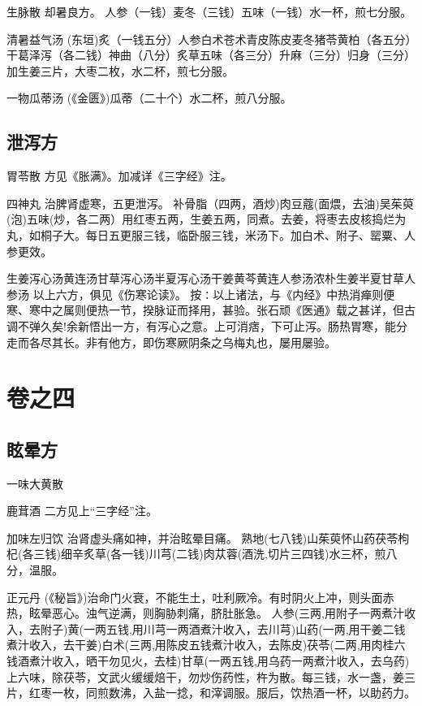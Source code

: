 \documentclass[a4paper,12pt,UTF8,twoside]{ctexbook}
\begin{document}
	生脉散
	却暑良方。
	人参（一钱）麦冬（三钱）五味（一钱）水一杯，煎七分服。
	
	清暑益气汤
	(东垣)炙（一钱五分）人参白术苍术青皮陈皮麦冬猪苓黄柏（各五分）干葛泽泻（各二钱）神曲（八分）炙草五味（各三分）升麻（三分）归身（三分）加生姜三片，大枣二枚，水二杯，煎七分服。
	
	一物瓜蒂汤
	(《金匮》)瓜蒂（二十个）水二杯，煎八分服。
	
	
	
	\section{泄泻方}
	
	
	胃苓散
	方见《胀满》。加减详《三字经》注。
	
	四神丸
	治脾肾虚寒，五更泄泻。
	补骨脂（四两，酒炒)肉豆蔻(面煨，去油)吴茱萸(泡)五味(炒，各二两）用红枣五两，生姜五两，同煮。去姜，将枣去皮核捣烂为丸，如桐子大。每日五更服三钱，临卧服三钱，米汤下。加白术、附子、罂粟、人参更效。
	
	生姜泻心汤黄连汤甘草泻心汤半夏泻心汤干姜黄芩黄连人参汤浓朴生姜半夏甘草人参汤
	以上六方，俱见《伤寒论读》。
	按∶以上诸法，与《内经》中热消瘅则便寒、寒中之属则便热一节，揆脉证而择用，甚验。张石顽《医通》载之甚详，但古调不弹久矣!余新悟出一方，有泻心之意。上可消痞，下可止泻。肠热胃寒，能分走而各尽其长。非有他方，即伤寒厥阴条之乌梅丸也，屡用屡验。
	
	

	
	\chapter{卷之四}
	\section{眩晕方}	
	
	一味大黄散
	
	鹿茸酒
	二方见上“三字经”注。
	
	加味左归饮
	治肾虚头痛如神，并治眩晕目痛。
	熟地(七八钱)山茱萸怀山药茯苓枸杞(各三钱)细辛炙草(各一钱)川芎(二钱)肉苁蓉(酒洗,切片三四钱)水三杯，煎八分，温服。
	
	正元丹
	(《秘旨》)治命门火衰，不能生土，吐利厥冷。有时阴火上冲，则头面赤热，眩晕恶心。浊气逆满，则胸胁刺痛，脐肚胀急。
	人参(三两,用附子一两煮汁收入，去附子)黄(一两五钱,用川芎一两酒煮汁收入，去川芎)山药(一两,用干姜二钱煮汁收入，去干姜)白术(三两,用陈皮五钱煮汁收入，去陈皮)茯苓(二两,用肉桂六钱酒煮汁收入，晒干勿见火，去桂)甘草(一两五钱,用乌药一两煮汁收入，去乌药)上六味，除茯苓，文武火缓缓焙干，勿炒伤药性，杵为散。每三钱，水一盏，姜三片，红枣一枚，同煎数沸，入盐一捻，和滓调服。服后，饮热酒一杯，以助药力。
	
\end{document}
